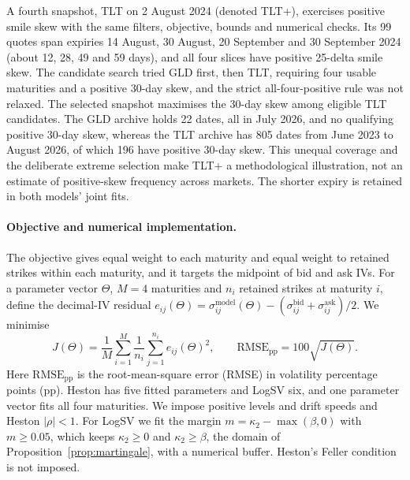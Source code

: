 A fourth snapshot, TLT on 2 August 2024 (denoted TLT+), exercises positive smile
skew with the same filters, objective, bounds and numerical checks. Its 99 quotes
span expiries 14 August, 30 August, 20 September and 30 September 2024 (about
12, 28, 49 and 59 days), and all four slices have positive 25-delta smile skew.
The candidate search tried GLD first, then TLT, requiring four usable maturities
and a positive 30-day skew, and the strict all-four-positive rule was not relaxed.
The selected snapshot maximises the 30-day skew among eligible TLT candidates.
The GLD archive holds 22 dates, all in July 2026, and no qualifying positive
30-day skew, whereas the TLT archive has 805 dates from June 2023 to August 2026, of which
196 have positive 30-day skew. This unequal coverage and the deliberate extreme
selection make TLT+ a methodological illustration, not an estimate of positive-skew
frequency across markets. The shorter expiry is retained in both models' joint fits.

\paragraph{Objective and numerical implementation.}
The objective gives equal weight to each maturity and equal weight to retained
strikes within each maturity, and it targets the midpoint of bid and ask IVs.
For a parameter vector $\Theta$, $M=4$ maturities and $n_i$ retained strikes at maturity
$i$, define the decimal-IV residual
$e_{ij}(\Theta)=\sigma^{\mathrm{model}}_{ij}(\Theta)
-(\sigma^{\mathrm{bid}}_{ij}+\sigma^{\mathrm{ask}}_{ij})/2$. We minimise
\begin{equation}
 J(\Theta)=\frac{1}{M}\sum_{i=1}^{M}\frac{1}{n_i}\sum_{j=1}^{n_i}e_{ij}(\Theta)^2,
 \qquad \mathrm{RMSE}_{\mathrm{pp}}=100\sqrt{J(\Theta)}.
 \label{eq:oca-calibration-objective}
\end{equation}
Here $\mathrm{RMSE}_{\mathrm{pp}}$ is the root-mean-square error (RMSE) in volatility
percentage points (pp). Heston has five fitted parameters and LogSV six, and one
parameter vector fits all four maturities. We impose positive levels and drift
speeds and Heston $|\rho|<1$. For LogSV we fit the margin
$m=\kappa_2-\max(\beta,0)$ with $m\geq0.05$, which keeps $\kappa_2\geq0$ and
$\kappa_2\geq\beta$, the domain of Proposition~\ref{prop:martingale}, with a
numerical buffer. Heston's Feller condition is not imposed.

